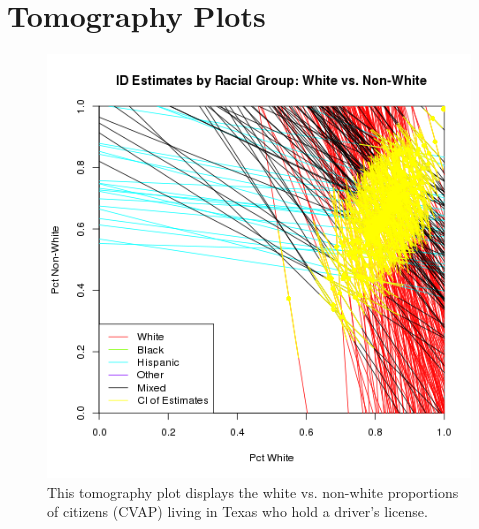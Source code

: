 \documentclass[12pt]{article}
\begin{document}
\singlespace
 
\bibsep=0in 
{}



\appendix
\renewcommand*\appendixpagename{\section*{Appendix}}
\appendixpage

\section{Tomography Plots}

\begin{figure}[htb]
\begin{centering}
\includegraphics[scale=.75]{figs/CVAP_f3_dl_white.png}
\caption{\label{tomog_white}This tomography plot displays the white vs. non-white proportions of citizens (CVAP)
living in Texas who hold a driver's license.}
\end{centering}
\end{figure}
\end{document}
